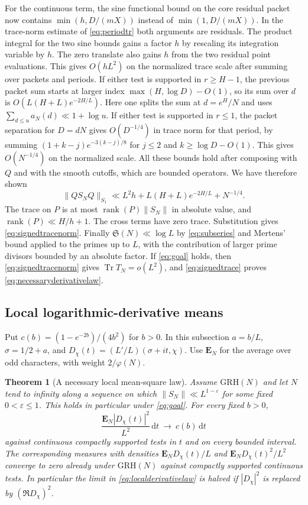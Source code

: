 \documentclass[11pt,a4paper]{article}
\numberwithin{equation}{section}
\newtheorem{theorem}{Theorem}[section]
\newcommand{\SSS}{\mathfrak S}
\newcommand{\grh}{\mathrm{GRH}}
\newcommand{\ud}{\mathrm d}
\begin{document}
For the continuous term, the sine functional bound on
the core residual packet now contains
$\min(h,D/(mX))$ instead of $\min(1,D/(mX))$.
In the trace-norm estimate of \cref{eq:periodtr} both
arguments are residuals. The product integral for the
two sine bounds gains a factor $h$ by rescaling its
integration variable by $h$. The zero translate also
gains $h$ from the two residual point evaluations.
This gives $O(h L^2)$ on the normalized trace scale
after summing over packets and periods. If either test
is supported in $r\ge H-1$, the previous packet sum
starts at larger index $\max(H,\log D)-O(1)$, so its
sum over $d$ is $O(L(H+L)e^{-2H/L})$. Here one splits
the sum at $d=e^H/N$ and uses
$\sum_{d\le u}a_N(d)\ll1+\log u$.
If either test is supported in $r\le1$, the packet
separation for $D=dN$ gives $O(D^{-1/4})$ in trace
norm for that period, by summing
$(1+k-j)e^{-3(k-j)/8}$ for $j\le2$ and
$k\ge\log D-O(1)$. This gives $O(N^{-1/4})$ on the
normalized scale. All these bounds hold after composing
with $Q$ and with the smooth cutoffs, which are bounded
operators. We have therefore shown
\[
 \|Q S_N Q\|_{S_1}\ll L^2h+L(H+L)e^{-2H/L}+N^{-1/4}.
\]
The trace on $P$ is at most $\operatorname{rank}(P)\|S_N\|$
in absolute value, and $\operatorname{rank}(P)\ll H/h+1$.
The cross terms have zero trace. Substitution gives
\cref{eq:signedtracenorm}. Finally $\SSS(N)\ll\log L$
by \cref{eq:subseries} and Mertens' bound applied to the
primes up to $L$, with the contribution of larger
prime divisors bounded by an absolute factor. If
\cref{eq:goal} holds, then \cref{eq:signedtracenorm}
gives $\operatorname{Tr}T_N=o(L^2)$, and
\cref{eq:signedtrace} proves \cref{eq:necessaryderivativelaw}.

\subsection{Local logarithmic-derivative means}

Put $c(b)=(1-e^{-2b})/(4b^2)$ for $b>0$. In this subsection
$a=b/L$, $\sigma=1/2+a$, and $D_\chi(t)=(L'/L)(\sigma+it,\chi)$.
Use $\mathbf E_N$ for the average over odd characters,
with weight $2/\varphi(N)$.

\begin{theorem}[A necessary local mean-square law]
\label{thm:localderivative}
Assume $\grh(N)$ and let $N$ tend to infinity along a sequence
on which $\|S_N\|\ll L^{1-\varepsilon}$ for some fixed
$0<\varepsilon\le1$. This holds in particular under
\cref{eq:goal}. For every fixed $b>0$,
\begin{equation}
 \frac{\mathbf E_N |D_\chi(t)|^2}{L^2}\,\ud t
           \ \longrightarrow\ c(b)\,\ud t
 \label{eq:localderivativelaw}
\end{equation}
against continuous compactly supported tests in $t$ and
on every bounded interval. The corresponding measures
with densities $\mathbf E_N D_\chi(t)/L$ and
$\mathbf E_N D_\chi(t)^2/L^2$ converge to zero already
under $\grh(N)$ against compactly supported continuous
tests. In particular the limit in
\cref{eq:localderivativelaw} is halved if $|D_\chi|^2$
is replaced by $(\Re D_\chi)^2$.
\end{theorem}
\end{document}

